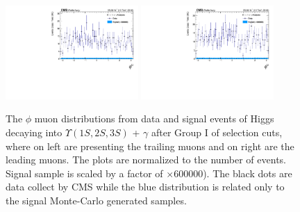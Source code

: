 \begin{figure}[!htbp]
\begin{center}
\includegraphics[width=0.45\textwidth]{figures_and_tables/outputPlots/HtoUpsilon_Cat0_ZZZZZ/nEvts/data_x_mc/withKinCuts/h_withKin_TrailingMu_phi}\hspace*{1.cm}
\includegraphics[width=0.45\textwidth]{figures_and_tables/outputPlots/HtoUpsilon_Cat0_ZZZZZ/nEvts/data_x_mc/withKinCuts/h_withKin_LeadingMu_phi}
\end{center}\vspace*{-.5cm}
\caption{The $\phi$ muon distributions from data and signal events of Higgs decaying into $\Upsilon(1S,2S,3S)$ + $\gamma$ after Group I of selection cuts, where on left are presenting the trailing muons and on right are the leading muons. The plots are normalized to the number of events. Signal sample is scaled by a factor of $\times 600000$). The black dots are data collect by CMS while the blue distribution is related only to the signal Monte-Carlo generated samples.}
\label{fig:phiMuons_HtoUpsilon_Cat0_groupI_plus_II}
\end{figure}


